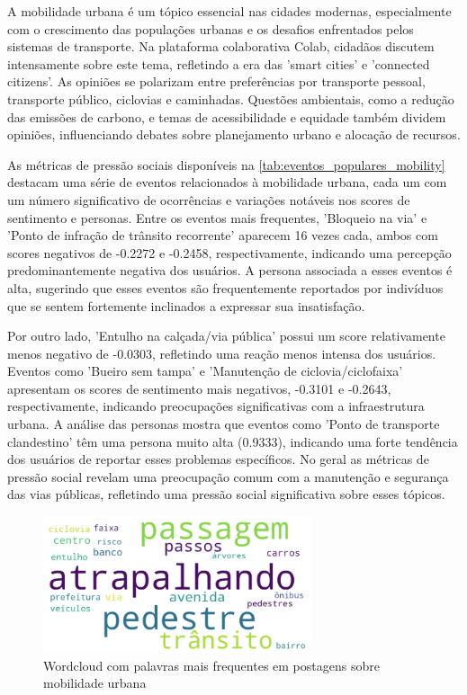 A mobilidade urbana é um tópico essencial nas cidades modernas, especialmente com o crescimento das populações urbanas e os desafios enfrentados pelos sistemas de transporte. Na plataforma colaborativa Colab, cidadãos discutem intensamente sobre este tema, refletindo a era das 'smart cities' e 'connected citizens'. As opiniões se polarizam entre preferências por transporte pessoal, transporte público, ciclovias e caminhadas. Questões ambientais, como a redução das emissões de carbono, e temas de acessibilidade e equidade também dividem opiniões, influenciando debates sobre planejamento urbano e alocação de recursos.

As métricas de pressão sociais disponíveis na \autoref{tab:eventos_populares_mobility} destacam uma série de eventos relacionados à mobilidade urbana, cada um com um número significativo de ocorrências e variações notáveis nos scores de sentimento e personas. Entre os eventos mais frequentes, 'Bloqueio na via' e 'Ponto de infração de trânsito recorrente' aparecem 16 vezes cada, ambos com scores negativos de -0.2272 e -0.2458, respectivamente, indicando uma percepção predominantemente negativa dos usuários. A persona associada a esses eventos é alta, sugerindo que esses eventos são frequentemente reportados por indivíduos que se sentem fortemente inclinados a expressar sua insatisfação.

Por outro lado, 'Entulho na calçada/via pública' possui um score relativamente menos negativo de -0.0303, refletindo uma reação menos intensa dos usuários. Eventos como 'Bueiro sem tampa' e 'Manutenção de ciclovia/ciclofaixa' apresentam os scores de sentimento mais negativos, -0.3101 e -0.2643, respectivamente, indicando preocupações significativas com a infraestrutura urbana. A análise das personas mostra que eventos como 'Ponto de transporte clandestino' têm uma persona muito alta (0.9333), indicando uma forte tendência dos usuários de reportar esses problemas específicos. No geral as métricas de pressão social revelam uma preocupação comum com a manutenção e segurança das vias públicas, refletindo uma pressão social significativa sobre esses tópicos.

\begin{figure}[htb]
	\centering
	\includegraphics[width=0.7\textwidth]{images/wordcloud_mobility.png}
	\caption{Wordcloud com palavras mais frequentes em postagens sobre mobilidade urbana}
	\label{fig:wordcloud_mobility}
\end{figure}

